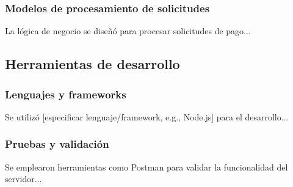 \subsubsection{Modelos de procesamiento de solicitudes}
\label{subsubsec:ProcesamientoSolicitudes}
La lógica de negocio se diseñó para procesar solicitudes de pago...

\subsection{Herramientas de desarrollo}
\label{subsec:HerramientasDesarrollo}
\subsubsection{Lenguajes y frameworks}
\label{subsubsec:LenguajesFrameworks}
Se utilizó [especificar lenguaje/framework, e.g., Node.js] para el desarrollo...

\subsubsection{Pruebas y validación}
\label{subsubsec:PruebasValidacion}
Se emplearon herramientas como Postman para validar la funcionalidad del servidor...
